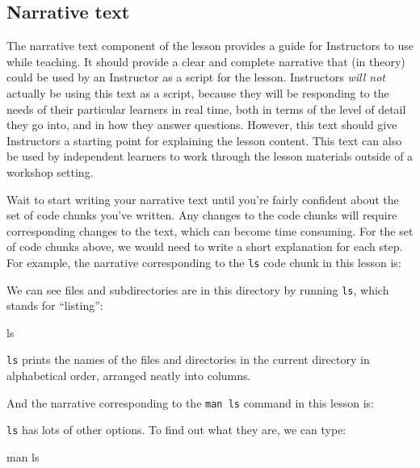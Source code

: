 \documentclass[
]{book}
\newenvironment{Shaded}{\begin{snugshade}}{\end{snugshade}}
\newcommand{\FunctionTok}[1]{\textcolor[rgb]{0.00,0.00,0.00}{#1}}
\newcommand{\NormalTok}[1]{#1}
\begin{document}
\hypertarget{narrative-text}{%
\subsection{Narrative text}\label{narrative-text}}

The narrative text component of the lesson provides a guide for Instructors to use while teaching. It should
provide a clear and complete narrative that (in theory) could be used by an Instructor as a script for
the lesson. Instructors \emph{will not} actually be using this text as a script, because they will be responding to
the needs of their particular learners in real time, both in terms of the level of detail they go into, and
in how they answer questions. However, this text should give Instructors a starting point for explaining the
lesson content. This text can also be used by independent learners to work through the lesson materials outside
of a workshop setting.

Wait to start writing your narrative text until you're fairly confident about the set of code chunks
you've written. Any changes to the code chunks will require corresponding changes to the text, which
can become time consuming. For the set of code chunks above, we would need to write a short explanation for
each step. For example, the narrative corresponding to the \texttt{ls} code chunk in this lesson is:

We can see files and subdirectories are in this directory by running \texttt{ls},
which stands for ``listing'':

\begin{Shaded}
\begin{Highlighting}[]
\FunctionTok{ls}
\end{Highlighting}
\end{Shaded}

\texttt{ls} prints the names of the files and directories in the current directory in
alphabetical order,
arranged neatly into columns.

And the narrative corresponding to the \texttt{man\ ls} command in this lesson is:

\texttt{ls} has lots of other options. To find out what they are, we can type:

\begin{Shaded}
\begin{Highlighting}[]
\FunctionTok{man}\NormalTok{ ls}
\end{Highlighting}
\end{Shaded}
\end{document}
